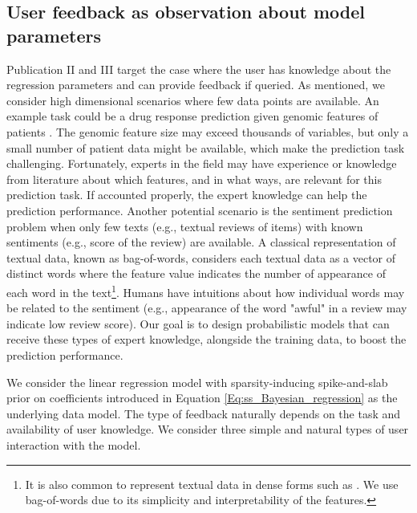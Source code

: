 \documentclass[dissertation,math,vertlayout,pdfa,colorlinks]{aaltoseries}
\begin{document}
\subsection{User feedback as observation about model parameters}
Publication II and III target the case where the user has knowledge about the regression parameters and can provide feedback if queried. As mentioned, we consider high dimensional scenarios where few data points are available. An example task could be a drug response prediction given genomic features of patients \cite{drug_response_prediction}. The genomic feature size may exceed thousands of variables, but only a small number of patient data might be available, which make the prediction task challenging. Fortunately, experts in the field may have experience or knowledge from literature about which features, and in what ways, are relevant for this prediction task. If accounted properly, the expert knowledge can help the prediction performance. Another potential scenario is the sentiment prediction problem \cite{liu2015sentiment} when only few texts (e.g., textual reviews of items) with known sentiments (e.g., score of the review) are available. A classical representation of textual data, known as bag-of-words, considers each textual data as a vector of distinct words where the feature value indicates the number of appearance of each word in the text\footnote{It is also common to represent textual data in dense forms such as \cite{dai2015semi}. We use bag-of-words due to its simplicity and interpretability of the features.}. Humans have intuitions about how individual words may be related to the sentiment (e.g., appearance of the word "awful" in a review may indicate low review score). Our goal is to design probabilistic models that can receive these types of expert knowledge, alongside the training data, to boost the prediction performance.  

We consider the linear regression model with sparsity-inducing spike-and-slab prior on coefficients introduced in Equation \ref{Eq:ss_Bayesian_regression} as the underlying data model. The type of feedback naturally depends on the task and availability of user knowledge.  We consider three simple and natural types of user interaction with the model. 
\end{document}
